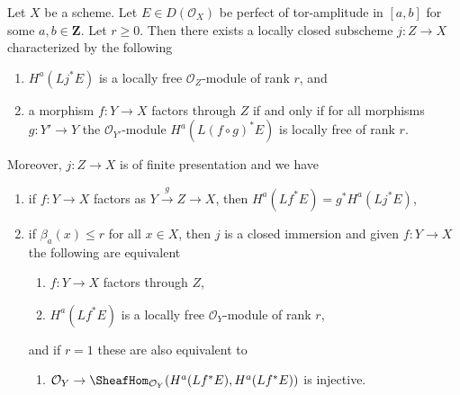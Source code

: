 \begin{lemma}
\label{lemma-locally-closed-where-H0-locally-free}
Let $X$ be a scheme. Let $E \in D(\mathcal{O}_X)$ be perfect
of tor-amplitude in $[a, b]$ for some $a, b \in \mathbf{Z}$.
Let $r \geq 0$.
Then there exists a locally closed subscheme $j : Z \to X$
characterized by the following
\begin{enumerate}
\item $H^a(Lj^*E)$ is a locally free $\mathcal{O}_Z$-module of rank $r$, and
\item a morphism $f : Y \to X$ factors through $Z$
if and only if for all morphisms $g : Y' \to Y$ the
$\mathcal{O}_{Y'}$-module $H^a(L(f \circ g)^*E)$ is locally free
of rank $r$.
\end{enumerate}
Moreover, $j : Z \to X$ is of finite presentation and we have
\begin{enumerate}
\item[(3)] if $f : Y \to X$ factors as $Y \xrightarrow{g} Z \to X$, then
$H^a(Lf^*E) = g^*H^a(Lj^*E)$,
\item[(4)] if $\beta_a(x) \leq r$ for all $x \in X$, then
$j$ is a closed immersion and given $f : Y \to X$ the following
are equivalent
\begin{enumerate}
\item $f : Y \to X$ factors through $Z$,
\item $H^a(Lf^*E)$ is a locally free $\mathcal{O}_Y$-module of rank $r$,
\end{enumerate}
and if $r = 1$ these are also equivalent to
\begin{enumerate}
\item[(c)] $\mathcal{O}_Y \to \SheafHom_{\mathcal{O}_Y}(H^a(Lf^*E), H^a(Lf^*E))$
is injective.
\end{enumerate}
\end{enumerate}
\end{lemma}

